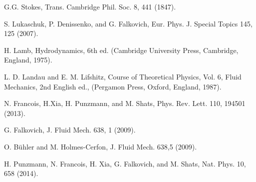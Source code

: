 \begin{thebibliography}{99}
G.G. Stokes, Trans. Cambridge Phil. Soc. 8, 441 (1847).



S. Lukaschuk, P. Denissenko, and G. Falkovich, Eur. Phys. J. Special Topics 145, 125 (2007).


H. Lamb, Hydrodynamics, 6th ed. (Cambridge University Press, Cambridge, England, 1975).

L. D. Landau and E. M. Lifshitz, Course of Theoretical Physics, Vol. 6, Fluid Mechanics, 2nd English ed., (Pergamon Press, Oxford, England, 1987).


N. Francois, H.Xia, H. Punzmann, and M. Shats, Phys. Rev. Lett. 110, 194501 (2013).





G. Falkovich, J. Fluid Mech. 638, 1 (2009).

O. Bühler and M. Holmes-Cerfon, J. Fluid Mech. 638,5 (2009).

H. Punzmann, N. Francois, H. Xia, G. Falkovich, and M. Shats, Nat. Phys. 10, 658 (2014).






\end{thebibliography}
